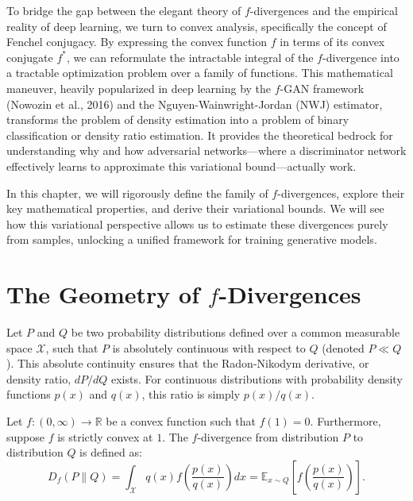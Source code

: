 To bridge the gap between the elegant theory of $f$-divergences and the empirical reality of deep learning, we turn to convex analysis, specifically the concept of Fenchel conjugacy. By expressing the convex function $f$ in terms of its convex conjugate $f^*$, we can reformulate the intractable integral of the $f$-divergence into a tractable optimization problem over a family of functions. This mathematical maneuver, heavily popularized in deep learning by the $f$-GAN framework (Nowozin et al., 2016) and the Nguyen-Wainwright-Jordan (NWJ) estimator, transforms the problem of density estimation into a problem of binary classification or density ratio estimation. It provides the theoretical bedrock for understanding why and how adversarial networks---where a discriminator network effectively learns to approximate this variational bound---actually work.

In this chapter, we will rigorously define the family of $f$-divergences, explore their key mathematical properties, and derive their variational bounds. We will see how this variational perspective allows us to estimate these divergences purely from samples, unlocking a unified framework for training generative models.

\section{The Geometry of $f$-Divergences}

Let $P$ and $Q$ be two probability distributions defined over a common measurable space $\mathcal{X}$, such that $P$ is absolutely continuous with respect to $Q$ (denoted $P \ll Q$). This absolute continuity ensures that the Radon-Nikodym derivative, or density ratio, $dP/dQ$ exists. For continuous distributions with probability density functions $p(x)$ and $q(x)$, this ratio is simply $p(x)/q(x)$.

\begin{definition}[$f$-Divergence]
Let $f: (0, \infty) \to \mathbb{R}$ be a convex function such that $f(1) = 0$. Furthermore, suppose $f$ is strictly convex at $1$. The $f$-divergence from distribution $P$ to distribution $Q$ is defined as:
\begin{equation}
    D_f(P \parallel Q) = \int_{\mathcal{X}} q(x) f\left( \frac{p(x)}{q(x)} \right) dx = \mathbb{E}_{x \sim Q} \left[ f\left( \frac{p(x)}{q(x)} \right) \right].
\end{equation}
\end{definition}

